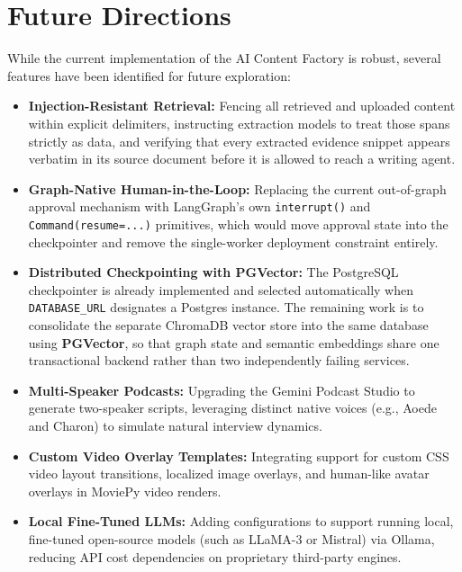 \section{Future Directions}

While the current implementation of the AI Content Factory is robust, several features have been identified for future exploration:

\begin{itemize}
    \item \textbf{Injection-Resistant Retrieval:} Fencing all retrieved and uploaded content within explicit delimiters, instructing extraction models to treat those spans strictly as data, and verifying that every extracted evidence snippet appears verbatim in its source document before it is allowed to reach a writing agent.
    \item \textbf{Graph-Native Human-in-the-Loop:} Replacing the current out-of-graph approval mechanism with LangGraph's own \texttt{interrupt()} and \texttt{Command(resume=...)} primitives, which would move approval state into the checkpointer and remove the single-worker deployment constraint entirely.
    \item \textbf{Distributed Checkpointing with PGVector:} The PostgreSQL checkpointer is already implemented and selected automatically when \texttt{DATABASE\_URL} designates a Postgres instance. The remaining work is to consolidate the separate ChromaDB vector store into the same database using \textbf{PGVector}, so that graph state and semantic embeddings share one transactional backend rather than two independently failing services.
    \item \textbf{Multi-Speaker Podcasts:} Upgrading the Gemini Podcast Studio to generate two-speaker scripts, leveraging distinct native voices (e.g., Aoede and Charon) to simulate natural interview dynamics.
    \item \textbf{Custom Video Overlay Templates:} Integrating support for custom CSS video layout transitions, localized image overlays, and human-like avatar overlays in MoviePy video renders.
    \item \textbf{Local Fine-Tuned LLMs:} Adding configurations to support running local, fine-tuned open-source models (such as LLaMA-3 or Mistral) via Ollama, reducing API cost dependencies on proprietary third-party engines.
\end{itemize}